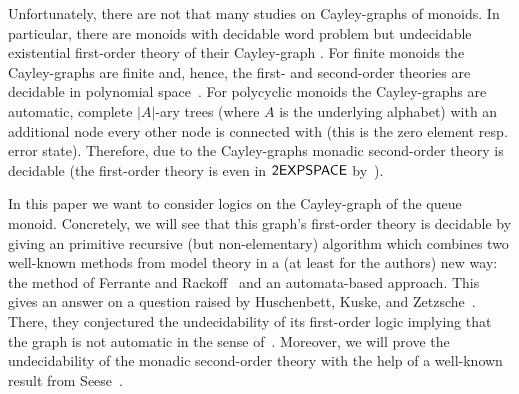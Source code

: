 Unfortunately, there are not that many studies on Cayley-graphs of monoids. In particular, there are monoids with decidable word problem but undecidable existential first-order theory of their Cayley-graph \cite{NarO90,KusL06}. For finite monoids the Cayley-graphs are finite and, hence, the first- and second-order theories are decidable in polynomial space~\cite{Graedel03}. For polycyclic monoids the Cayley-graphs are automatic, complete $|A|$-ary trees (where $A$ is the underlying alphabet) with an additional node every other node is connected with (this is the zero element resp. error state). Therefore, due to \cite{KusL06} the Cayley-graphs monadic second-order theory is decidable (the first-order theory is even in $\mathsf{2EXPSPACE}$ by~\cite{KusL11}).

In this paper we want to consider logics on the Cayley-graph of the queue monoid. Concretely, we will see that this graph's first-order theory is decidable by giving an primitive recursive (but non-elementary) algorithm which combines two well-known methods from model theory in a (at least for the authors) new way: the method of Ferrante and Rackoff~\cite{FerR79} and an automata-based approach. This gives an answer on a question raised by Huschenbett, Kuske, and Zetzsche~\cite{HusKZ17}. There, they conjectured the undecidability of its first-order logic implying that the graph is not automatic in the sense of~\cite{KN95}. Moreover, we will prove the undecidability of the monadic second-order theory with the help of a well-known result from Seese~\cite{See91}.